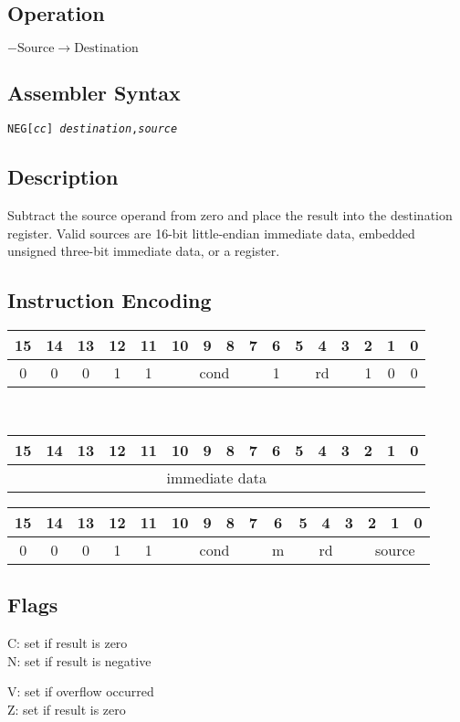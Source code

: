 \documentclass[11pt]{book}
\newcommand*{\encoding}[1]{\noindent
\begin{tabular}{|c|c|c|c|c|c|c|c|c|c|c|c|c|c|c|c|}
\multicolumn{1}{c}{15}&
\multicolumn{1}{c}{14}&
\multicolumn{1}{c}{13}&
\multicolumn{1}{c}{12}&
\multicolumn{1}{c}{11}&
\multicolumn{1}{c}{10}&
\multicolumn{1}{c}{9}&
\multicolumn{1}{c}{8}&
\multicolumn{1}{c}{7}&
\multicolumn{1}{c}{6}&
\multicolumn{1}{c}{5}&
\multicolumn{1}{c}{4}&
\multicolumn{1}{c}{3}&
\multicolumn{1}{c}{2}&
\multicolumn{1}{c}{1}&
\multicolumn{1}{c}{0}\\\hline
#1\\\hline
\end{tabular}}
\newcommand*{\instruction}[2][]{%
  \clearpage
  \thispagestyle{fancy}%
  \fancyhf[HL,HR]{\huge{#2}}%
  \fancyhf[HC]{#1}\addtocounter{section}{1}\noindent
}
\begin{document}

\instruction[Negate]{NEG}
\subsection*{Operation}
\(-\text{Source}\rightarrow\text{Destination}\)

\subsection*{Assembler Syntax}
\texttt{NEG[\textit{cc}] \textit{destination},\textit{source}}

\subsection*{Description}
Subtract the source operand from zero
and place the result into the destination register.
Valid sources are 16-bit little-endian immediate data,
embedded unsigned three-bit immediate data,
or a register.

\subsection*{Instruction Encoding}
\encoding{0&0&0&1&1%
&\multicolumn{4}{|c|}{cond}%
&1&\multicolumn{3}{|c|}{rd}&1&0&0}\\\null\qquad
\encoding{\multicolumn{16}{|c|}{immediate data}}

\vspace{2\baselineskip}
\encoding{0&0&0&1&1%
&\multicolumn{4}{|c|}{cond}%
&m&\multicolumn{3}{|c|}{rd}&\multicolumn{3}{|c|}{source}}

\subsection*{Flags}
\begin{multicols}{2}\noindent
  C: set if result is zero\\
  N: set if result is negative

  \columnbreak\noindent
  V: set if overflow occurred\\
  Z: set if result is zero
\end{multicols}
\end{document}
